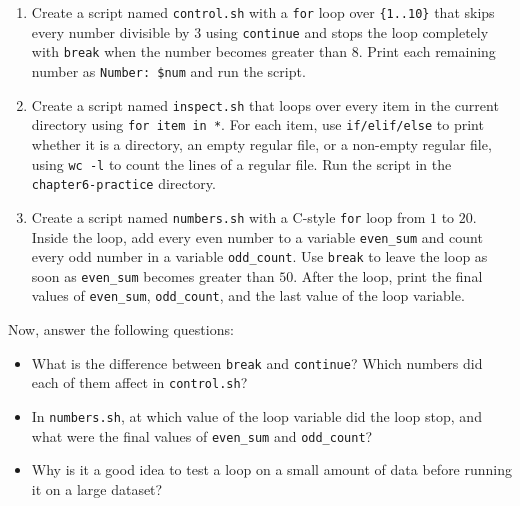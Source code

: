 \begin{enumerate}
    \item Create a script named \texttt{control.sh} with a \texttt{for} loop over \texttt{\{1..10\}} that skips every number divisible by $3$ using \texttt{continue} and stops the loop completely with \texttt{break} when the number becomes greater than $8$. Print each remaining number as \texttt{Number: \$num} and run the script.
    \item Create a script named \texttt{inspect.sh} that loops over every item in the current directory using \texttt{for item in *}. For each item, use \texttt{if/elif/else} to print whether it is a directory, an empty regular file, or a non-empty regular file, using \texttt{wc -l} to count the lines of a regular file. Run the script in the \texttt{chapter6-practice} directory.
    \item Create a script named \texttt{numbers.sh} with a C-style \texttt{for} loop from $1$ to $20$. Inside the loop, add every even number to a variable \texttt{even\_sum} and count every odd number in a variable \texttt{odd\_count}. Use \texttt{break} to leave the loop as soon as \texttt{even\_sum} becomes greater than $50$. After the loop, print the final values of \texttt{even\_sum}, \texttt{odd\_count}, and the last value of the loop variable.
\end{enumerate}

Now, answer the following questions:
\begin{itemize}
    \item What is the difference between \texttt{break} and \texttt{continue}? Which numbers did each of them affect in \texttt{control.sh}?
    \item In \texttt{numbers.sh}, at which value of the loop variable did the loop stop, and what were the final values of \texttt{even\_sum} and \texttt{odd\_count}?
    \item Why is it a good idea to test a loop on a small amount of data before running it on a large dataset?
\end{itemize}